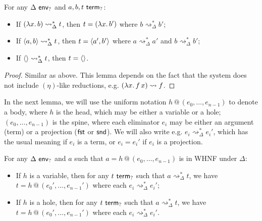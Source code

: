 \documentclass[twoside]{report}
\begin{document}
\begin{proposition}
    \label{thm:persistence_of_constructors}
    For any $\Delta \ \mathsf{env}_{?}$ and $a, b, t \ \mathsf{term}_{?}$:
    \begin{itemize}[noitemsep]
        \item If $(\lambda{x}.\,{b}) \rightsquigarrow_\Delta^\ast t$, then $t = (\lambda{x}.\,{b'})$ where $b \rightsquigarrow_\Delta^\ast {b'}$;
        \item If $\langle{a}, {b}\rangle \rightsquigarrow_\Delta^\ast t$, then $t = \langle{a'}, {b'}\rangle$ where $a \rightsquigarrow_\Delta^\ast {a'}$ and $b \rightsquigarrow_\Delta^\ast {b'}$;
        \item If $\langle\rangle \rightsquigarrow_\Delta^\ast t$, then $t = \langle\rangle$.
    \end{itemize}
\end{proposition}

\begin{proof}
    Similar as above. This lemma depends on the fact that the system does not include $(\eta)$-like reductions, e.g. $(\lambda{x}.\,{{f}\,{x}}) \rightsquigarrow f$.
\end{proof}

\newcommand{\form}[2]{{#1}\,@\,({#2})}
\newcommand{\sol}{\operatorname{sol}}

In the next lemma, we will use the uniform notation $\form h {e_0, \ldots, e_{n-1}}$ to denote a body, where $h$ is the head, which may be either a variable or a hole; $(e_0, \ldots, e_{n-1})$ is the spine, where each eliminator $e_i$ may be either an argument (term) or a projection ($\operatorname{\mathsf{fst}}$ or $\operatorname{\mathsf{snd}}$). We will also write e.g. $e_i \rightsquigarrow_\Delta^\ast e_i'$, which has the usual meaning if $e_i$ is a term, or $e_i = e_i'$ if $e_i$ is a projection.

\begin{proposition}
    \label{thm:persistence_of_bodies}
    For any $\Delta \ \mathsf{env}_{?}$ and $a$ such that $a = \form h {e_0, \ldots, e_{n-1}}$ is in WHNF under $\Delta$:
    \begin{itemize}[noitemsep]
        \item If $h$ is a variable, then for any $t \ \mathsf{term}_{?}$ such that $a \rightsquigarrow_\Delta^\ast t$, we have $t = \form h {e_0', \ldots, e_{n-1}'}$ where each $e_i \rightsquigarrow_\Delta^\ast e_i'$;
        \item If $h$ is a hole, then for any $t \ \mathsf{term}_{?}$ such that $a \rightsquigarrow_\Delta^\ast t$, we have $t = \form h {e_0', \ldots, e_{n-1}'}$ where each $e_i \rightsquigarrow_\Delta^\ast e_i'$.
    \end{itemize}
\end{proposition}
\end{document}
